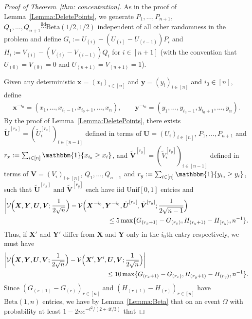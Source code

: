 \documentclass[11pt]{article}
\newcommand{\iid}{\stackrel{\mathrm{iid}}\sim}
\newcommand{\bs}[1]{\boldsymbol{#1}}
\begin{document}
\begin{proof}[Proof of Theorem~\ref{thm: concentration}]
As in the proof of Lemma~\ref{Lemma:DeletePoints}, we generate $P_1,\ldots,P_{n+1},$ $Q_1,\ldots,Q_{n+1}\iid \mathrm{Beta}(1/2,1/2)$ independent of all other randomness in the problem and define $G_i := U_{(i)}-(U_{(i)}-U_{(i-1)})P_i$ and $H_i := V_{(i)}-(V_{(i)}-V_{(i-1)})Q_i$ for $i\in[n+1]$ (with the convention that $U_{(0)}=V_{(0)}=0$ and $U_{(n+1)}=V_{(n+1)}=1$). 

Given any deterministic $\bs x =(x_i)_{i\in[n]}$ and $\bs y = (y_i)_{i\in[n]}$ and $i_0\in[n]$, define 
\begin{align*}
    \bs x^{-i_0} = (x_1,\ldots,x_{i_0-1},x_{i_0+1},\ldots,x_n), \qquad \bs y^{-i_0} = (y_1,\ldots,y_{i_0-1},y_{i_0+1},\ldots,y_n).
\end{align*}
By the proof of Lemma~\ref{Lemma:DeletePoints}, there exists $\tilde{\bs U}^{[r_x]} = (\tilde U_i^{[r_x]})_{i\in[n-1]}$ defined in terms of $\bs U = (U_i)_{i\in[n]}$, $P_1,\ldots,P_{n+1}$ and $r_x:=\sum_{i\in[n]}\mathbbm{1}\{x_{i_0}\geq x_i\}$, and  $\tilde{\bs V}^{[r_y]} = (\tilde V_i^{[r_y]})_{i\in[n-1]}$ defined in terms of $\bs V = (V_i)_{i\in[n]}$, $Q_1,\ldots,Q_{n+1}$ and $r_y:=\sum_{i\in[n]}\mathbbm{1}\{y_{i_0}\geq y_i\}$, such that $\tilde{\bs U}^{[r_x]}$ and $\tilde{\bs V}^{[r_y]}$ each have iid $\mathrm{Unif}[0,1]$ entries and 
\begin{align*}
\biggl|\mathcal{V}\Bigl(\bs X, \bs Y, \bs U, \bs V;\frac{1}{2\sqrt{n}}\Bigr) &- \mathcal{V}\Bigl(\bs X^{-i_0}, \bs Y^{-i_0}, \tilde{\bs U}^{[r_x]}, \tilde{\bs V}^{[r_y]};\frac{1}{2\sqrt{n-1}}\Bigr)\biggr|\\
&\hspace{2cm}\leq 5 \max\{G_{(r_x+1)}-G_{(r_x)}, H_{(r_y+1)}-H_{(r_y)}, n^{-1}\}.
\end{align*}
Thus, if $\bs X'$ and $\bs Y'$ differ from $\bs X$ and $\bs Y$ only in the $i_0$th entry respectively, we must have 
\begin{align*}
\biggl|\mathcal{V}\Bigl(\bs X, \bs Y, \bs U, \bs V;\frac{1}{2\sqrt{n}}\Bigr) &- \mathcal{V}\Bigl(\bs X', \bs Y', \bs U, \bs V;\frac{1}{2\sqrt{n}}\Bigr)\biggr|\\
&\hspace{2cm}\leq 10 \max\{G_{(r_x+1)}-G_{(r_x)}, H_{(r_y+1)}-H_{(r_y)}, n^{-1}\}.
\end{align*}
Since $(G_{(r+1)}-G_{(r)})_{r\in[n]}$ and $(H_{(r+1)}-H_{(r)})_{r\in[n]}$ have $\mathrm{Beta}(1,n)$ entries, we have by Lemma~\ref{Lemma:Beta} that on an event $\Omega$ with probability at least $1-2ne^{-t^2/(2+4t/3)}$ that 

\end{proof}
\end{document}
